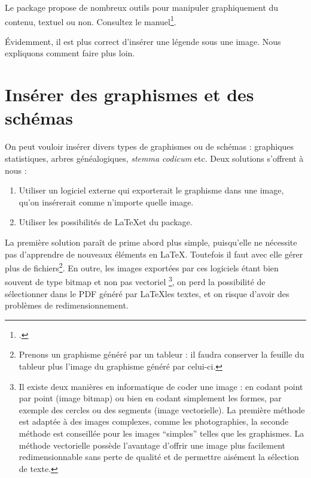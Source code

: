 \begin{plusloins}
Le package  propose de nombreux outils pour manipuler graphiquement du contenu, textuel ou non. Consultez le manuel\footcite{graphicx}.
\end{plusloins}

\begin{attention}
    Évidemment, il est plus correct d'insérer une légende sous une image. Nous expliquons comment faire plus loin.
\end{attention}

\section{Insérer des graphismes et des schémas}

On peut vouloir insérer divers types de graphismes ou de schémas : graphiques statistiques, arbres généalogiques, \emph{stemma codicum} etc.
Deux solutions s'offrent à nous :
\begin{enumerate}
\item Utiliser un logiciel externe qui exporterait le graphisme dans une image, qu'on insérerait comme n'importe quelle image.
\item Utiliser les possibilités de \LaTeX et du package.\label{TikZ}
\end{enumerate}

La première solution paraît de prime abord plus simple, puisqu'elle ne nécessite pas d'apprendre de nouveaux éléments en \LaTeX. Toutefois il faut avec elle gérer plus de fichiers\footnote{Prenons un graphisme généré par un tableur : il faudra conserver la feuille du tableur plus l'image du graphisme généré par celui-ci.}. En outre, les images exportées par ces logiciels étant bien souvent de type bitmap et non pas vectoriel%
\footnote{Il existe deux manières en informatique de coder une image : en codant point par point (image bitmap) ou bien en codant simplement les formes, par exemple des cercles ou des segments (image vectorielle). La première méthode est adaptée à des images complexes, comme les photographies,  la seconde méthode est conseillée pour les images \enquote{simples} telles que les graphismes. La méthode vectorielle possède l'avantage d'offrir une image plus facilement redimensionnable  sans perte de qualité et de permettre aisément la sélection de texte.},
on perd la possibilité de sélectionner dans le PDF généré par \LaTeX les textes, et on risque d'avoir des problèmes de redimensionnement.

